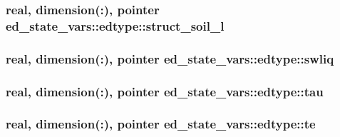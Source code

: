 \subsubsection[{\texorpdfstring{struct\+\_\+soil\+\_\+l}{struct_soil_l}}]{\setlength{\rightskip}{0pt plus 5cm}real, dimension(\+:), pointer ed\+\_\+state\+\_\+vars\+::edtype\+::struct\+\_\+soil\+\_\+l}\hypertarget{structed__state__vars_1_1edtype_a5398d06d5e12d9f3f410792be76c9f69}{}\label{structed__state__vars_1_1edtype_a5398d06d5e12d9f3f410792be76c9f69}
\subsubsection[{\texorpdfstring{swliq}{swliq}}]{\setlength{\rightskip}{0pt plus 5cm}real, dimension(\+:), pointer ed\+\_\+state\+\_\+vars\+::edtype\+::swliq}\hypertarget{structed__state__vars_1_1edtype_a6ebe8fb6f6bc5d4e1443dba7ed49a4f3}{}\label{structed__state__vars_1_1edtype_a6ebe8fb6f6bc5d4e1443dba7ed49a4f3}
\subsubsection[{\texorpdfstring{tau}{tau}}]{\setlength{\rightskip}{0pt plus 5cm}real, dimension(\+:), pointer ed\+\_\+state\+\_\+vars\+::edtype\+::tau}\hypertarget{structed__state__vars_1_1edtype_a731ac9a995e74ebb5fcfeb255117f36b}{}\label{structed__state__vars_1_1edtype_a731ac9a995e74ebb5fcfeb255117f36b}
\subsubsection[{\texorpdfstring{te}{te}}]{\setlength{\rightskip}{0pt plus 5cm}real, dimension(\+:), pointer ed\+\_\+state\+\_\+vars\+::edtype\+::te}\hypertarget{structed__state__vars_1_1edtype_a4e4056d3af8745709271b1df98d70b29}{}\label{structed__state__vars_1_1edtype_a4e4056d3af8745709271b1df98d70b29}
